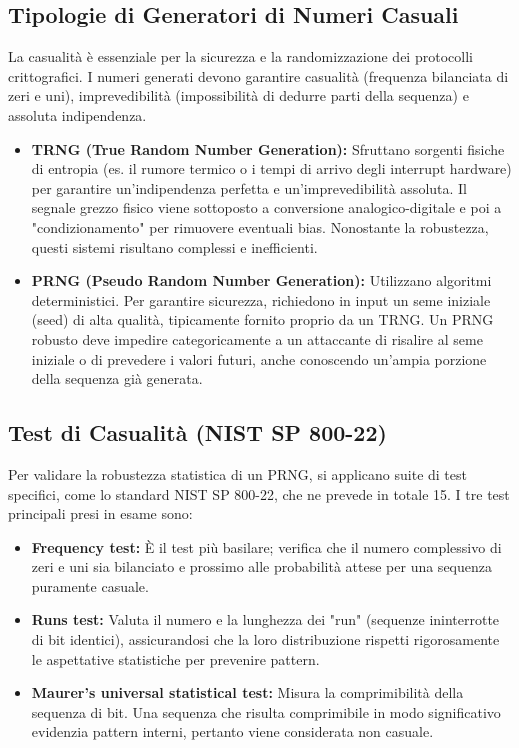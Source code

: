 \documentclass[12pt, a4paper]{report}
\begin{document}
\subsection{Tipologie di Generatori di Numeri Casuali}
La casualità è essenziale per la sicurezza e la randomizzazione dei protocolli crittografici. I numeri generati devono garantire casualità (frequenza bilanciata di zeri e uni), imprevedibilità (impossibilità di dedurre parti della sequenza) e assoluta indipendenza.
\begin{itemize}
	\item \textbf{TRNG (True Random Number Generation):} Sfruttano sorgenti fisiche di entropia (es. il rumore termico o i tempi di arrivo degli interrupt hardware) per garantire un'indipendenza perfetta e un'imprevedibilità assoluta. Il segnale grezzo fisico viene sottoposto a conversione analogico-digitale e poi a "condizionamento" per rimuovere eventuali bias. Nonostante la robustezza, questi sistemi risultano complessi e inefficienti.
	\item \textbf{PRNG (Pseudo Random Number Generation):} Utilizzano algoritmi deterministici. Per garantire sicurezza, richiedono in input un seme iniziale (seed) di alta qualità, tipicamente fornito proprio da un TRNG. Un PRNG robusto deve impedire categoricamente a un attaccante di risalire al seme iniziale o di prevedere i valori futuri, anche conoscendo un'ampia porzione della sequenza già generata.
\end{itemize}

\subsection{Test di Casualità (NIST SP 800-22)}
Per validare la robustezza statistica di un PRNG, si applicano suite di test specifici, come lo standard NIST SP 800-22, che ne prevede in totale 15. I tre test principali presi in esame sono:
\begin{itemize}
	\item \textbf{Frequency test:} È il test più basilare; verifica che il numero complessivo di zeri e uni sia bilanciato e prossimo alle probabilità attese per una sequenza puramente casuale.
	\item \textbf{Runs test:} Valuta il numero e la lunghezza dei "run" (sequenze ininterrotte di bit identici), assicurandosi che la loro distribuzione rispetti rigorosamente le aspettative statistiche per prevenire pattern.
	\item \textbf{Maurer's universal statistical test:} Misura la comprimibilità della sequenza di bit. Una sequenza che risulta comprimibile in modo significativo evidenzia pattern interni, pertanto viene considerata non casuale.
\end{itemize}
\end{document}
